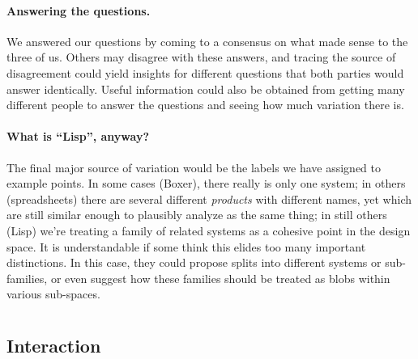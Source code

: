 \documentclass[english,submission]{programming}
\providecommand{\DIFadd}[1]{{\protect\color{blue}\uwave{#1}}} %
\providecommand{\DIFaddbegin}{} %
\providecommand{\DIFaddend}{} %
\providecommand{\DIFdelbegin}{} %
\providecommand{\DIFdelend}{} %
\begin{document}
\paragraph{Answering the questions.}

We answered our questions by coming to a consensus on what made sense to
the three of us. Others may disagree with these answers, and tracing the
source of disagreement could yield insights for different questions that
both parties would answer identically. Useful information could also be
obtained from getting many different people to answer the questions and
seeing how much variation there is.

\paragraph{What is ``Lisp'', anyway?}

The final major source of variation would be the labels we have assigned
to example points. In some cases (Boxer), there really is only one
system; in others (spreadsheets) there are several different
\emph{products} with different names, yet which are still similar enough
to plausibly analyze as the same thing; in still others (Lisp) we're
treating a family of related systems as a cohesive point in the design
space. It is understandable if some think this elides too many important
distinctions. In this case, they could propose splits into different
systems or sub-families, or even suggest how these families should be
treated as blobs within various sub-spaces.

\DIFdelbegin %
\DIFdelend \DIFaddbegin \section{\DIFadd{Dimensions Catalogue}}
\DIFaddend 

\hypertarget{interaction}{%
\subsection{Interaction}\label{interaction}}

\end{document}
